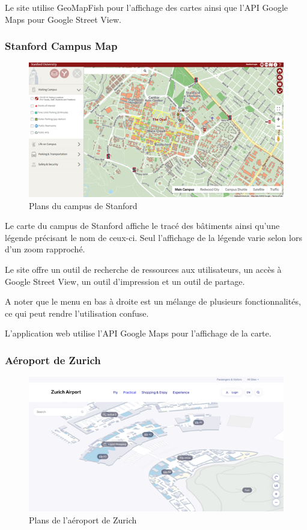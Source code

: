 \documentclass[
    iai, %
    il, %
]{heig-tb}
\begin{document}
Le site utilise GeoMapFish pour l'affichage des cartes ainsi que l'API Google Maps pour Google Street View.

\subsubsection{Stanford Campus Map}

\begin{figure}[h]
    \centering
    \includegraphics[scale=0.7]{standfordCampusMap.png}
    \caption{Plans du campus de Stanford}
\end{figure}

Le carte du campus de Stanford \cite{standford-map} affiche le tracé des bâtiments ainsi qu'une légende précisant le nom de ceux-ci.
Seul l'affichage de la légende varie selon lors d'un zoom rapproché.

Le site offre un outil de recherche de ressources aux utilisateurs, un accès à Google Street View, un outil d'impression et un outil de partage.

A noter que le menu en bas à droite est un mélange de plusieurs fonctionnalités, ce qui peut rendre l'utilisation confuse.

L'application web utilise l'API Google Maps pour l'affichage de la carte.

\subsubsection{Aéroport de Zurich}

\begin{figure}[h]
    \centering
    \includegraphics[scale=0.7]{planZurichAirport.png}
    \caption{Plans de l'aéroport de Zurich}
\end{figure}
\end{document}
